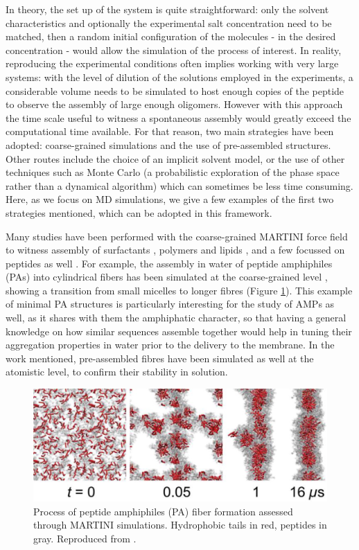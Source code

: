In theory, the set up of the system is quite straightforward: only the solvent characteristics and optionally the experimental salt concentration need to be matched, then a random initial configuration of the molecules - in the desired concentration - would allow the simulation of the process of interest.
%
In reality, reproducing the experimental conditions often implies working with very large systems: with the level of dilution of the solutions employed in the experiments, a considerable volume needs to be simulated to host enough copies of the peptide to observe the assembly of large enough oligomers.
%
However with this approach the time scale useful to witness a spontaneous assembly would greatly exceed the computational time available. For that reason, two main strategies have been adopted: coarse-grained simulations and the use of pre-assembled structures. Other routes include the choice of an implicit solvent model, or the use of other techniques such as Monte Carlo (a probabilistic exploration of the phase space rather than a dynamical algorithm) which can sometimes be less time consuming. Here, as we focus on MD simulations, we give a few examples of the first two strategies mentioned, which can be adopted in this framework.

Many studies have been performed with the coarse-grained MARTINI force field to witness assembly of surfactants \citep{Wu2012}, polymers \citep{Wang2012poly,Bochicchio2017} and lipids \citep{Lee2011,Brocos2012}, and a few focussed on peptides as well \citep{Guo2012,Seo2012}.
%
For example, the assembly in water of peptide amphiphiles (PAs) into cylindrical fibers has been simulated at the coarse-grained level \citep{Lee2012}, showing a transition from small micelles to longer fibres (Figure \ref{fig:PA}). This example of minimal PA structures is particularly interesting for the study of AMPs as well, as it shares with them the amphiphatic character, so that having a general knowledge on how similar sequences assemble together would help in tuning their aggregation properties in water prior to the delivery to the membrane.
%
In the work mentioned, pre-assembled fibres have been simulated as well at the atomistic level, to confirm their stability in solution.
%
\begin{figure}[t!]
\centering
\includegraphics[width=0.8\linewidth]{2methods/pics/PA.jpeg}
%
\caption[Peptide amphiphiles assembly through MARTINI simulations]{Process of peptide amphiphiles (PA) fiber formation assessed through MARTINI simulations. Hydrophobic tails in red, peptides in gray. Reproduced from \citet{Lee2012}.}
\label{fig:PA}
\end{figure}

